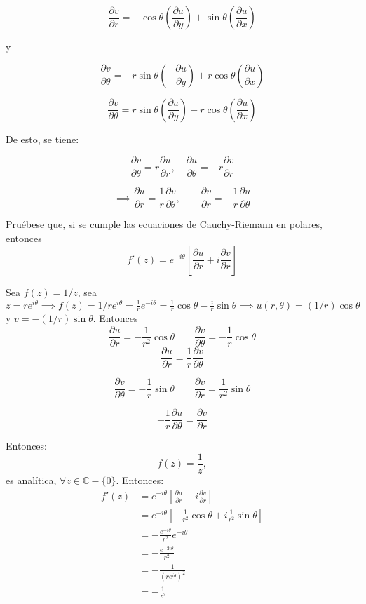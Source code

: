 $$\frac{\partial v}{\partial r}=- \cos\theta \left(\frac{\partial u}{\partial y}\right)+\sin \theta\left(\frac{\partial u}{\partial x}\right)$$

y 

$$\frac{\partial v}{\partial \theta}=-r\sin\theta \left(-\frac{\partial u}{\partial y}\right)+r\cos \theta\left(\frac{\partial u}{\partial x}\right)$$

$$\frac{\partial v}{\partial \theta}=r\sin\theta \left(\frac{\partial u}{\partial y}\right)+r\cos \theta\left(\frac{\partial u}{\partial x}\right)$$

De esto, se tiene: 

$$\frac{\partial v}{\partial \theta}=r\frac{\partial u}{\partial r},\quad \frac{\partial u}{\partial \theta}=-r\frac{\partial v}{\partial r}$$

$$\implies \frac{\partial u}{\partial r}=\frac{1}{r}\frac{\partial v}{\partial \theta}, \qquad \frac{\partial v}{\partial r}=-\frac{1}{r}\frac{\partial u}{\partial \theta }$$



\begin{problema}
    Pruébese que, si se cumple las ecuaciones de Cauchy-Riemann en polares, entonces $$f'(z)=e^{-i\theta}\left[\frac{\partial u}{\partial r}+i\frac{\partial v}{\partial r}\right]$$
\end{problema}

\begin{ejemplo}
    Sea $f(z)=1/z$, sea $z=re^{i\theta}\implies f(z)=1/re^{i\theta}=\frac{1}{r}e^{-i\theta}=\frac{1}{r}\cos\theta -\frac{i}{r}\sin \theta \implies u(r,\theta)=(1/r)\cos\theta$ y $v=-(1/r)\sin \theta$. Entonces 
    $$\frac{\partial u}{\partial r}=-\frac{1}{r^2}\cos\theta\qquad \frac{\partial v}{\partial \theta}=-\frac{1}{r}\cos\theta$$
    $$\frac{\partial u}{\partial r}=\frac{1}{r}\frac{\partial v}{\partial \theta }$$

    $$\frac{\partial v}{\partial \theta}= -\frac{1}{r}\sin \theta \qquad \frac{\partial v}{\partial r}=\frac{1}{r^2}\sin \theta$$

    $$-\frac{1}{r}\frac{\partial u}{\partial \theta}=\frac{\partial v}{\partial r}$$

    Entonces: 
    $$f(z)=\frac{1}{z},$$
    es analítica, $\forall z\in \mathbb{C}-\{0\}$. Entonces:
    \begin{align*}
        f'(z)&=e^{-i\theta}\left[\frac{\partial u}{\partial r}+i\frac{\partial v}{\partial r}\right]\\
        &= e^{-i\theta}\left[-\frac{1}{r^2}\cos\theta +i \frac{1}{r^2}\sin\theta\right]\\
        &= -\frac{e^{-i\theta}}{r^2}e^{-i\theta}\\
        &= -\frac{e^{-2i\theta}}{r^2}\\
        &= -\frac{1}{(re^{i\theta})^2}\\
        &= -\frac{1}{z^2}
    \end{align*}


\end{ejemplo}

